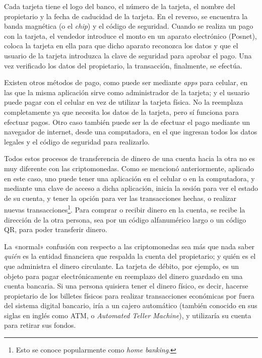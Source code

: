 \documentclass[12pt,a4paper,twoside]{book}
\begin{document}
Cada tarjeta tiene el logo del banco, el número de la tarjeta, el nombre del propietario y la fecha de caducidad de la tarjeta. En el reverso, se encuentra la banda magnética (o el \textit{chip}) y el código de seguridad. Cuando se realiza un pago con la tarjeta, el vendedor introduce el monto en un aparato electrónico (Posnet), coloca la tarjeta en ella para que dicho aparato reconozca los datos y que el usuario de la tarjeta introduzca la clave de seguridad para aprobar el pago. Una vez verificado los datos del propietario, la transacción, finalmente, se efectúa.

Existen otros métodos de pago, como puede ser mediante \textit{apps} para celular, en las que la misma aplicación sirve como administrador de la tarjeta; y el usuario puede pagar con el celular en vez de utilizar la tarjeta física. No la reemplaza completamente ya que necesita los datos de la tarjeta, pero sí funciona para efectuar pagos. Otro caso también puede ser la de efectuar el pago mediante un navegador de internet, desde una computadora, en el que ingresan todos los datos legales y el código de seguridad para realizarlo.

Todos estos procesos de transferencia de dinero de una cuenta hacia la otra no es muy diferente con las criptomonedas. Como se mencionó anteriormente, aplicado en este caso, uno puede tener una aplicación en el celular o en la computadora, y mediante una clave de acceso a dicha aplicación, inicia la sesión para ver el estado de su cuenta, y tener la opción para ver las transacciones hechas, o realizar nuevas transacciones\footnote{Esto se conoce popularmente como \textit{home banking}.}. Para comprar o recibir dinero en la cuenta, se recibe la dirección de la otra persona, sea por un código alfanumérico largo o un código QR, para poder transferir dinero.

La «normal» confusión con respecto a las criptomonedas sea más que nada saber \textit{quién} es la entidad financiera que respalda la cuenta del propietario; y quién es el que administra el dinero circulante. La tarjeta de débito, por ejemplo, es un objeto para pagar electrónicamente en reemplazo del dinero guardado en una cuenta bancaria. Si una persona quisiera tener el dinero físico, es decir, hacerse propietario de los billetes físicos para realizar transacciones económicas por fuera del sistema digital bancario, iría a un cajero automático (también conocido en sus siglas en inglés como ATM, o \textit{Automated Teller Machine}), y utilizaría su cuenta para retirar sus fondos.
\end{document}

